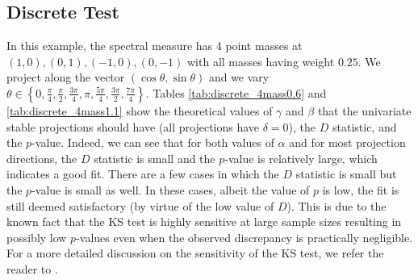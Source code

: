 \subsection{Discrete Test}
In this example, the spectral measure has 4 point masses at $(1,0),(0,1),(-1,0),(0,-1)$ with all masses having weight $0.25$. We project along the vector $(\cos\theta,\sin\theta)$ and we vary $\theta\in\left\{0,\frac{\pi}{4},\frac{\pi}{2},\frac{3\pi}{4},\pi,\frac{5\pi}{4},\frac{3\pi}{2},\frac{7\pi}{4}\right\}.$ Tables \ref{tab:discrete_4mass0.6} and \ref{tab:discrete_4mass1.1} show the theoretical values of $\gamma$ and $\beta$ that the univariate stable projections should have (all projections have $\delta=0$), the $D$ statistic, and the $p$-value. Indeed, we can see that for both values of $\alpha$ and for most projection directions, the $D$ statistic is small and the $p$-value is relatively large, which indicates a good fit. There are a few cases in which the $D$ statistic is small but the $p$-value is small as well. In these cases, albeit the value of $p$ is low, the fit is still deemed satisfactory (by virtue of the low value of $D$). This is due to the known fact that the KS test is highly sensitive at large sample sizes resulting in possibly low $p$-values even when the observed discrepancy is practically negligible. For a more detailed discussion on the sensitivity of the KS test, we refer the reader to \cite[Section 10.6]{degroot2018probability}.
